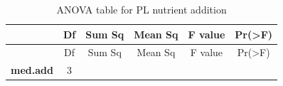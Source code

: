\documentclass[]{article}
\begin{document}
\begin{longtable}[]{@{}cccccc@{}}
\caption{ANOVA table for PL nutrient addition}\tabularnewline
\toprule
\begin{minipage}[b]{0.19\columnwidth}\centering\strut
~\strut
\end{minipage} & \begin{minipage}[b]{0.06\columnwidth}\centering\strut
Df\strut
\end{minipage} & \begin{minipage}[b]{0.10\columnwidth}\centering\strut
Sum Sq\strut
\end{minipage} & \begin{minipage}[b]{0.12\columnwidth}\centering\strut
Mean Sq\strut
\end{minipage} & \begin{minipage}[b]{0.12\columnwidth}\centering\strut
F value\strut
\end{minipage} & \begin{minipage}[b]{0.12\columnwidth}\centering\strut
Pr(\textgreater{}F)\strut
\end{minipage}\tabularnewline
\midrule
\endfirsthead
\toprule
\begin{minipage}[b]{0.19\columnwidth}\centering\strut
~\strut
\end{minipage} & \begin{minipage}[b]{0.06\columnwidth}\centering\strut
Df\strut
\end{minipage} & \begin{minipage}[b]{0.10\columnwidth}\centering\strut
Sum Sq\strut
\end{minipage} & \begin{minipage}[b]{0.12\columnwidth}\centering\strut
Mean Sq\strut
\end{minipage} & \begin{minipage}[b]{0.12\columnwidth}\centering\strut
F value\strut
\end{minipage} & \begin{minipage}[b]{0.12\columnwidth}\centering\strut
Pr(\textgreater{}F)\strut
\end{minipage}\tabularnewline
\midrule
\endhead
\begin{minipage}[t]{0.19\columnwidth}\centering\strut
\textbf{med.add}\strut
\end{minipage} & \begin{minipage}[t]{0.06\columnwidth}\centering\strut
3\strut
\end{minipage} & \begin{minipage}[t]{0.10\columnwidth}\centering\strut

\end{minipage}
\end{longtable}
\end{document}
